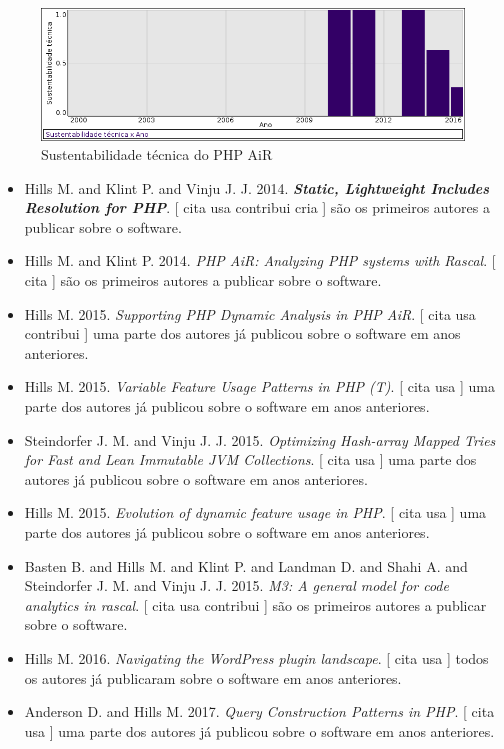 \begin{figure}[h]
  \center
  \includegraphics[scale=0.50]{imagens/softwares-charts/php-air.png}
  \caption{Sustentabilidade técnica do PHP AiR}
\end{figure}


\begin{itemize}
\item Hills M. and Klint P. and Vinju J. J.
      2014.
        \textbf{\textit{ Static, Lightweight Includes Resolution for PHP}}.
      [
          cita
          usa
          contribui
          cria
      ]
são os primeiros autores a publicar sobre o software.
\item Hills M. and Klint P.
      2014.
        \textit{ PHP AiR: Analyzing PHP systems with Rascal}.
      [
          cita
      ]
são os primeiros autores a publicar sobre o software.
\item Hills M.
      2015.
        \textit{ Supporting PHP Dynamic Analysis in PHP AiR}.
      [
          cita
          usa
          contribui
      ]
uma parte dos autores já publicou sobre o software em anos anteriores.
\item Hills M.
      2015.
        \textit{ Variable Feature Usage Patterns in PHP (T)}.
      [
          cita
          usa
      ]
uma parte dos autores já publicou sobre o software em anos anteriores.
\item Steindorfer J. M. and Vinju J. J.
      2015.
        \textit{ Optimizing Hash-array Mapped Tries for Fast and Lean Immutable JVM Collections}.
      [
          cita
          usa
      ]
uma parte dos autores já publicou sobre o software em anos anteriores.
\item Hills M.
      2015.
        \textit{ Evolution of dynamic feature usage in PHP}.
      [
          cita
          usa
      ]
uma parte dos autores já publicou sobre o software em anos anteriores.
\item Basten B. and Hills M. and Klint P. and Landman D. and Shahi A. and Steindorfer J. M. and Vinju J. J.
      2015.
        \textit{ M3: A general model for code analytics in rascal}.
      [
          cita
          usa
          contribui
      ]
são os primeiros autores a publicar sobre o software.
\item Hills M.
      2016.
        \textit{ Navigating the WordPress plugin landscape}.
      [
          cita
          usa
      ]
todos os autores já publicaram sobre o software em anos anteriores.
\item Anderson D. and Hills M.
      2017.
        \textit{ Query Construction Patterns in PHP}.
      [
          cita
          usa
      ]
uma parte dos autores já publicou sobre o software em anos anteriores.
\end{itemize}

